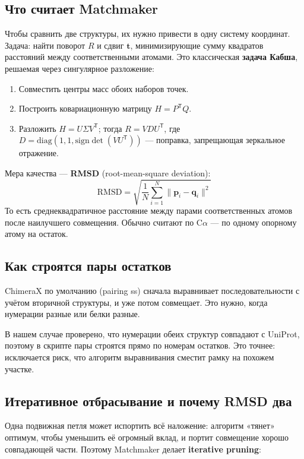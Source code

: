 \documentclass[12pt,a4paper]{article}
\newcommand{\code}[1]{{\ttfamily #1}}
\begin{document}
\subsection{Что считает Matchmaker}

Чтобы сравнить две структуры, их нужно привести в одну систему координат. Задача:
найти поворот $R$ и сдвиг $\mathbf{t}$, минимизирующие сумму квадратов расстояний
между соответственными атомами. Это классическая \textbf{задача Кабша}, решаемая
через сингулярное разложение:

\begin{enumerate}[leftmargin=*,topsep=2pt,itemsep=2pt]
\item Совместить центры масс обоих наборов точек.
\item Построить ковариационную матрицу $H = P^{\mathsf T} Q$.
\item Разложить $H = U \Sigma V^{\mathsf T}$; тогда $R = V D U^{\mathsf T}$, где
$D = \mathrm{diag}(1, 1, \mathrm{sign}\det(VU^{\mathsf T}))$ --- поправка,
запрещающая зеркальное отражение.
\end{enumerate}

Мера качества --- \textbf{RMSD} (root-mean-square deviation):
\[
\mathrm{RMSD} = \sqrt{\frac{1}{N}\sum_{i=1}^{N} \lVert \mathbf{p}_i - \mathbf{q}_i \rVert^2 }
\]
То есть среднеквадратичное расстояние между парами соответственных атомов после
наилучшего совмещения. Обычно считают по C$\alpha$ --- по одному опорному атому
на остаток.

\subsection{Как строятся пары остатков}

ChimeraX по умолчанию (\code{pairing ss}) сначала выравнивает последовательности с
учётом вторичной структуры, и уже потом совмещает. Это нужно, когда нумерации
разные или белки разные.

В нашем случае проверено, что нумерации обеих структур совпадают с UniProt, поэтому
в скрипте пары строятся прямо по номерам остатков. Это точнее: исключается риск,
что алгоритм выравнивания сместит рамку на похожем участке.

\subsection{Итеративное отбрасывание и почему RMSD два}

Одна подвижная петля может испортить всё наложение: алгоритм «тянет» оптимум, чтобы
уменьшить её огромный вклад, и портит совмещение хорошо совпадающей части.
Поэтому Matchmaker делает \textbf{iterative pruning}:
\end{document}
